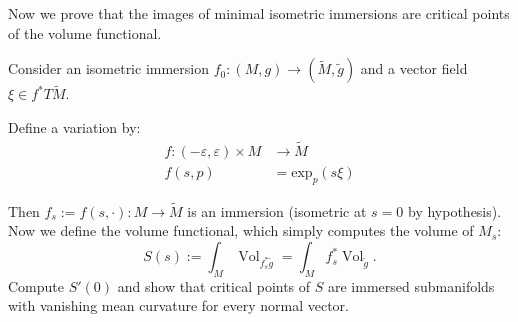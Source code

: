\medskip\noindent

Now we prove that the images of minimal
isometric immersions are critical points
of the volume functional.

\begin{exercise}
\label{exercise-minim-isome-immer-criti}
Consider an isometric immersion $f_0:(M,g)
\to(\tilde{M},\tilde{g})$ and a
vector field $\xi \in f^*T\tilde{M}$.

Define a variation by:
$$
\begin{aligned}
f: (-\varepsilon,\varepsilon)\times M
&\longrightarrow \tilde{M} \\
f(s,p) &=\text{exp}_{p}(s \xi)
\end{aligned}
$$

Then $f_s:=f(s,\cdot):M \longrightarrow
\tilde{M}$ is an immersion (isometric at
$s=0$ by hypothesis). Now we define the
volume functional, which simply
computes the volume of $M_s$:
$$
S(s):= \int_{M}\operatorname{Vol}_{f_s
^*\tilde{g}}
=\int_M f_s^*\operatorname{Vol}_{\tilde{g}}.
$$
Compute $S'(0)$ and show that critical points
of $S$ are immersed submanifolds with
vanishing mean curvature for every normal
vector.
\end{exercise}

